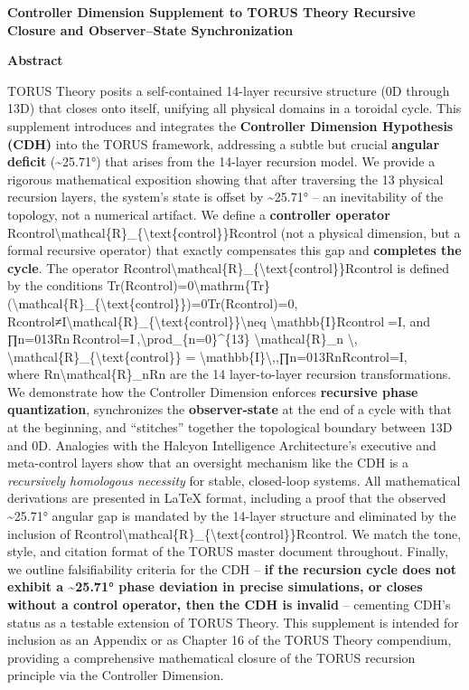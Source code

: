 \documentclass[]{article}
\date{}
\begin{document}
\textbf{Controller Dimension Supplement to TORUS Theory Recursive
Closure and Observer--State Synchronization}

\textbf{Abstract}

TORUS Theory posits a self-contained 14-layer recursive structure (0D
through 13D) that closes onto itself​, unifying all physical domains in
a toroidal cycle. This supplement introduces and integrates the
\textbf{Controller Dimension Hypothesis (CDH)} into the TORUS framework,
addressing a subtle but crucial \textbf{angular deficit}
(\textasciitilde{}25.71°) that arises from the 14-layer recursion model.
We provide a rigorous mathematical exposition showing that after
traversing the 13 physical recursion layers, the system's state is
offset by \textasciitilde{}25.71° -- an inevitability of the topology,
not a numerical artifact. We define a \textbf{controller operator}
Rcontrol\textbackslash{}mathcal\{R\}\_\{\textbackslash{}text\{control\}\}Rcontrol​
(not a physical dimension, but a formal recursive operator) that exactly
compensates this gap and \textbf{completes the cycle}. The operator
Rcontrol\textbackslash{}mathcal\{R\}\_\{\textbackslash{}text\{control\}\}Rcontrol​
is defined by the conditions
Tr(Rcontrol)=0\textbackslash{}mathrm\{Tr\}(\textbackslash{}mathcal\{R\}\_\{\textbackslash{}text\{control\}\})=0Tr(Rcontrol​)=0,
Rcontrol≠I\textbackslash{}mathcal\{R\}\_\{\textbackslash{}text\{control\}\}\textbackslash{}neq
\textbackslash{}mathbb\{I\}Rcontrol​=I, and\\
∏n=013Rn Rcontrol=I ,\textbackslash{}prod\_\{n=0\}\^{}\{13\}
\textbackslash{}mathcal\{R\}\_n \textbackslash{},
\textbackslash{}mathcal\{R\}\_\{\textbackslash{}text\{control\}\} =
\textbackslash{}mathbb\{I\}\textbackslash{},,∏n=013​Rn​Rcontrol​=I,\\
where Rn\textbackslash{}mathcal\{R\}\_nRn​ are the 14 layer-to-layer
recursion transformations. We demonstrate how the Controller Dimension
enforces \textbf{recursive phase quantization}, synchronizes the
\textbf{observer-state} at the end of a cycle with that at the
beginning, and ``stitches'' together the topological boundary between
13D and 0D. Analogies with the Halcyon Intelligence Architecture's
executive and meta-control layers show that an oversight mechanism like
the CDH is a \emph{recursively homologous necessity} for stable,
closed-loop systems​. All mathematical derivations are presented in
LaTeX format, including a proof that the observed
\textasciitilde{}25.71° angular gap is mandated by the 14-layer
structure and eliminated by the inclusion of
Rcontrol\textbackslash{}mathcal\{R\}\_\{\textbackslash{}text\{control\}\}Rcontrol​.
We match the tone, style, and citation format of the TORUS master
document throughout. Finally, we outline falsifiability criteria for the
CDH -- \textbf{if the recursion cycle does not exhibit a
\textasciitilde{}25.71° phase deviation in precise simulations, or
closes without a control operator, then the CDH is invalid} -- cementing
CDH's status as a testable extension of TORUS Theory. This supplement is
intended for inclusion as an Appendix or as Chapter 16 of the TORUS
Theory compendium, providing a comprehensive mathematical closure of the
TORUS recursion principle via the Controller Dimension.
\end{document}
